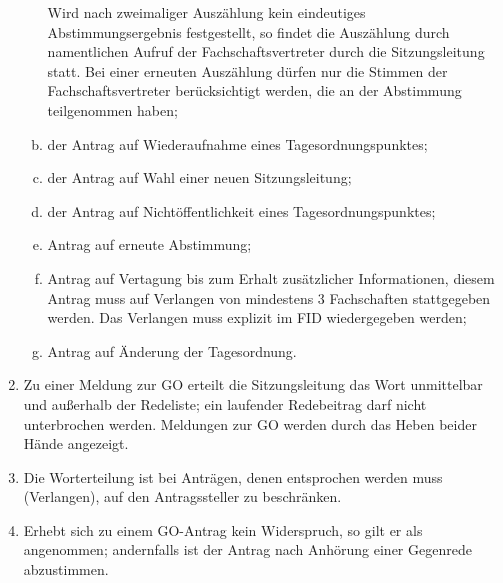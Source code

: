 \documentclass{article}
\begin{document}
\begin{enumerate}[(1)]
\begin{enumerate}[a)]
        	Wird nach zweimaliger Auszählung kein eindeutiges Abstimmungsergebnis festgestellt, so findet die Auszählung durch namentlichen Aufruf der Fachschaftsvertreter durch die Sitzungsleitung statt. 
        	Bei einer erneuten Auszählung dürfen nur die Stimmen der Fachschaftsvertreter berücksichtigt werden, die an der Abstimmung teilgenommen haben;
        \item der Antrag auf Wiederaufnahme eines Tagesordnungspunktes;
        \item der Antrag auf Wahl einer neuen Sitzungsleitung;
        \item der Antrag auf Nichtöffentlichkeit eines Tagesordnungspunktes;
        \item Antrag auf erneute Abstimmung;
        \item Antrag auf Vertagung bis zum Erhalt zusätzlicher Informationen, diesem Antrag muss auf Verlangen von mindestens 3 Fachschaften stattgegeben werden.
        	Das Verlangen muss explizit im FID wiedergegeben werden;
        \item Antrag auf Änderung der Tagesordnung.
    \end{enumerate}
    \item Zu einer Meldung zur GO erteilt die Sitzungsleitung das Wort unmittelbar und außerhalb der Redeliste; ein laufender Redebeitrag darf nicht unterbrochen werden. 
    	Meldungen zur GO werden durch das Heben beider Hände angezeigt.
    \item Die Worterteilung ist bei Anträgen, denen entsprochen werden muss (Verlangen), auf den Antragssteller zu beschränken.
    \item Erhebt sich zu einem GO-Antrag kein Widerspruch, so gilt er als angenommen; andernfalls ist der Antrag nach Anhörung einer Gegenrede abzustimmen.
\end{enumerate}
\end{document}

